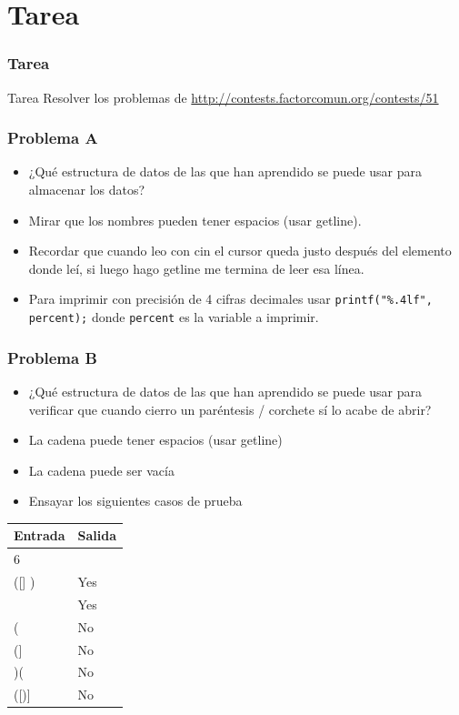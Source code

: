 \documentclass{beamer}
\begin{document}
\section{Tarea}
	\begin{frame}
		\frametitle{Tarea}
		\begin{alertblock}{Tarea}
			Resolver los problemas de \url{http://contests.factorcomun.org/contests/51}
		\end{alertblock}
	\end{frame}
	
	\begin{frame}[fragile]
		\frametitle{Problema A}
		\begin{itemize}
			\item ¿Qué estructura de datos de las que han aprendido se puede usar para almacenar los datos?
			\item Mirar que los nombres pueden tener espacios (usar getline).
			\item Recordar que cuando leo con cin el cursor queda justo después del elemento donde leí, si luego hago getline me termina de leer esa línea.
			\item Para imprimir con precisión de 4 cifras decimales usar \verb|printf("%.4lf", percent);| donde \verb|percent| es la variable a imprimir.
		\end{itemize}
	\end{frame}
	
	\begin{frame}[fragile]
		\frametitle{Problema B}
		\begin{itemize}
			\item ¿Qué estructura de datos de las que han aprendido se puede usar para verificar que cuando cierro un paréntesis / corchete sí lo acabe de abrir?
			\item La cadena puede tener espacios (usar getline)
			\item La cadena puede ser vacía
			\item Ensayar los siguientes casos de prueba
		\end{itemize}
		\begin{center}
			\begin{tabular}{|l|l|}
				\hline
				Entrada & Salida \\
				\hline
				6       &      \\
				([] )   & Yes  \\
				        & Yes  \\
				(       & No   \\
				(]      & No   \\
				)(      & No   \\
				([)]    & No   \\
				\hline
			\end{tabular}
		\end{center}
	\end{frame}
	
\end{document}
